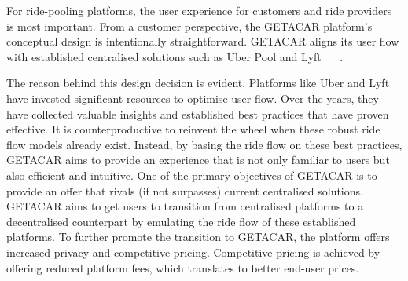 For ride-pooling platforms, the user experience for customers and ride providers is most important. From a customer perspective, the GETACAR platform's conceptual design is intentionally straightforward. GETACAR aligns its user flow with established centralised solutions such as Uber Pool and Lyft ~\cite{Uber.} ~\cite{Lift.}.

The reason behind this design decision is evident. Platforms like Uber and Lyft have invested significant resources to optimise user flow. Over the years, they have collected valuable insights and established best practices that have proven effective. It is counterproductive to reinvent the wheel when these robust ride flow models already exist. Instead, by basing the ride flow on these best practices, GETACAR aims to provide an experience that is not only familiar to users but also efficient and intuitive. 
One of the primary objectives of GETACAR is to provide an offer that rivals (if not surpasses) current centralised solutions. GETACAR aims to get users to transition from centralised platforms to a decentralised counterpart by emulating the ride flow of these established platforms. To further promote the transition to GETACAR, the platform offers increased privacy and competitive pricing.
Competitive pricing is achieved by offering reduced platform fees, which translates to better end-user prices. 

